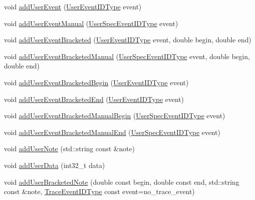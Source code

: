 \begin{DoxyCompactItemize}
void \hyperlink{structvt_1_1trace_1_1_trace_a0a4bbdf7bd3c2b8742cbceb24389a4c0}{add\+User\+Event} (\hyperlink{namespacevt_1_1trace_a5908920d051c144c89f17c69ed262350}{User\+Event\+I\+D\+Type} event)
\item 
void \hyperlink{structvt_1_1trace_1_1_trace_a2d9fac6bd71ba67e4f87b7efd7c6c6c7}{add\+User\+Event\+Manual} (\hyperlink{namespacevt_1_1trace_a70c43e0e1596eea236912d4197d3120a}{User\+Spec\+Event\+I\+D\+Type} event)
\item 
void \hyperlink{structvt_1_1trace_1_1_trace_ae57a7ff5517a5bc0694677f10810b545}{add\+User\+Event\+Bracketed} (\hyperlink{namespacevt_1_1trace_a5908920d051c144c89f17c69ed262350}{User\+Event\+I\+D\+Type} event, double begin, double end)
\item 
void \hyperlink{structvt_1_1trace_1_1_trace_ab0dd676ca3870682b0c52669d3603c11}{add\+User\+Event\+Bracketed\+Manual} (\hyperlink{namespacevt_1_1trace_a70c43e0e1596eea236912d4197d3120a}{User\+Spec\+Event\+I\+D\+Type} event, double begin, double end)
\item 
void \hyperlink{structvt_1_1trace_1_1_trace_a1264ea508298bfeb6a6ef5e06d9214f9}{add\+User\+Event\+Bracketed\+Begin} (\hyperlink{namespacevt_1_1trace_a5908920d051c144c89f17c69ed262350}{User\+Event\+I\+D\+Type} event)
\item 
void \hyperlink{structvt_1_1trace_1_1_trace_a9ed44cd0fb5939013ae30de2aeb8aa0e}{add\+User\+Event\+Bracketed\+End} (\hyperlink{namespacevt_1_1trace_a5908920d051c144c89f17c69ed262350}{User\+Event\+I\+D\+Type} event)
\item 
void \hyperlink{structvt_1_1trace_1_1_trace_ab6def24560e35a011beb771b2a05894c}{add\+User\+Event\+Bracketed\+Manual\+Begin} (\hyperlink{namespacevt_1_1trace_a70c43e0e1596eea236912d4197d3120a}{User\+Spec\+Event\+I\+D\+Type} event)
\item 
void \hyperlink{structvt_1_1trace_1_1_trace_a5de97038ac60bfcdf868c3f32637ef9e}{add\+User\+Event\+Bracketed\+Manual\+End} (\hyperlink{namespacevt_1_1trace_a70c43e0e1596eea236912d4197d3120a}{User\+Spec\+Event\+I\+D\+Type} event)
\item 
void \hyperlink{structvt_1_1trace_1_1_trace_a8be5309a84a6d0f99df0eb835fedf3b1}{add\+User\+Note} (std\+::string const \&note)
\item 
void \hyperlink{structvt_1_1trace_1_1_trace_a7f5ede52aa552c2eac88b894853a2efe}{add\+User\+Data} (int32\+\_\+t data)
\item 
void \hyperlink{structvt_1_1trace_1_1_trace_acb4416918d08379892bcf9ec85621309}{add\+User\+Bracketed\+Note} (double const begin, double const end, std\+::string const \&note, \hyperlink{namespacevt_1_1trace_a64a7185f3e102df8d8258f263ccd1582}{Trace\+Event\+I\+D\+Type} const event=no\+\_\+trace\+\_\+event)

\end{DoxyCompactItemize}
